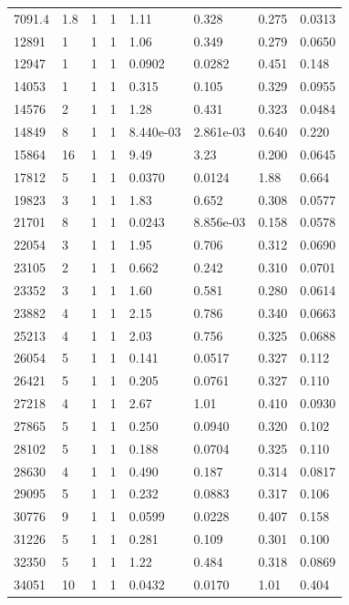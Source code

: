 \documentclass[preview]{standalone}
\begin{document}
{{{{{{{{{{{{{\begin{tabular}{L{1.2cm}C{1.2cm} C{0.3cm}C{0.5cm} C{1.4cm}C{1.4cm} C{1.4cm}C{1.4cm}}
  7091.4  &   1.8  & 1     &  1 &  1.11  & 0.328  & 0.275 &  0.0313   \\ 
  12891  &     1  & 1     &  1 &  1.06  & 0.349  & 0.279 &  0.0650   \\ 
  12947  &     1  & 1     &  1 &  0.0902  & 0.0282  & 0.451 &  0.148   \\ 
  14053  &     1  & 1     &  1 &  0.315  & 0.105  & 0.329 &  0.0955   \\ 
  14576  &     2  & 1     &  1 &  1.28  & 0.431  & 0.323 &  0.0484   \\ 
  14849  &     8  & 1     &  1 &  8.440e-03  & 2.861e-03  & 0.640 &  0.220   \\ 
  15864  &    16  & 1     &  1 &  9.49  & 3.23  & 0.200 &  0.0645   \\ 
  17812  &     5  & 1     &  1 &  0.0370  & 0.0124  & 1.88 &  0.664   \\ 
  19823  &     3  & 1     &  1 &  1.83  & 0.652  & 0.308 &  0.0577   \\ 
  21701  &     8  & 1     &  1 &  0.0243  & 8.856e-03  & 0.158 &  0.0578   \\ 
  22054  &     3  & 1     &  1 &  1.95  & 0.706  & 0.312 &  0.0690   \\ 
  23105  &     2  & 1     &  1 &  0.662  & 0.242  & 0.310 &  0.0701   \\ 
  23352  &     3  & 1     &  1 &  1.60  & 0.581  & 0.280 &  0.0614   \\ 
  23882  &     4  & 1     &  1 &  2.15  & 0.786  & 0.340 &  0.0663   \\ 
  25213  &     4  & 1     &  1 &  2.03  & 0.756  & 0.325 &  0.0688   \\ 
  26054  &     5  & 1     &  1 &  0.141  & 0.0517  & 0.327 &  0.112   \\ 
  26421  &     5  & 1     &  1 &  0.205  & 0.0761  & 0.327 &  0.110   \\ 
  27218  &     4  & 1     &  1 &  2.67  & 1.01  & 0.410 &  0.0930   \\ 
  27865  &     5  & 1     &  1 &  0.250  & 0.0940  & 0.320 &  0.102   \\ 
  28102  &     5  & 1     &  1 &  0.188  & 0.0704  & 0.325 &  0.110   \\ 
  28630  &     4  & 1     &  1 &  0.490  & 0.187  & 0.314 &  0.0817   \\ 
  29095  &     5  & 1     &  1 &  0.232  & 0.0883  & 0.317 &  0.106   \\ 
  30776  &     9  & 1     &  1 &  0.0599  & 0.0228  & 0.407 &  0.158   \\ 
  31226  &     5  & 1     &  1 &  0.281  & 0.109  & 0.301 &  0.100   \\ 
  32350  &     5  & 1     &  1 &  1.22  & 0.484  & 0.318 &  0.0869   \\ 
  34051  &    10  & 1     &  1 &  0.0432  & 0.0170  & 1.01 &  0.404   \\ 
\hline 
\end{tabular} 

}}}}}}}}}}}}}
\end{document}
